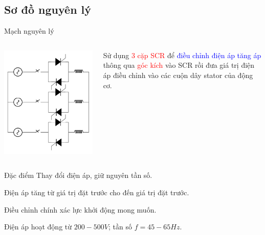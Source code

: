 \documentclass{beamer}
\begin{document}
\subsection*{Sơ đồ nguyên lý}
\begin{frame}{Mạch nguyên lý}
	\vspace{-1.2cm}
	\begin{columns}
		\begin{center}
			\includegraphics[scale=.45,angle=-90]{../sodomach/khoidongmem.pdf} 
		\end{center}
		
		\justifying
		Sử dụng \textcolor{red}{3 cặp SCR} để \textcolor{blue}{điều chỉnh điện áp} \textcolor{blue}{tăng áp} thông qua \textcolor{red}{góc kích} vào SCR rồi đưa giá trị điện áp điều chỉnh vào các cuộn dây stator của động cơ.
	\end{columns}
	\begin{block}{Đặc điểm}
		\justifying
		Thay đổi điện áp, giữ nguyên tần số.
		
		\begin{list}{--}{}
			\item Điện áp tăng từ giá trị đặt trước cho đến giá trị đặt trước.
			\item Điều chỉnh chính xác lực khởi động mong muốn.
			\item Điện áp hoạt động từ $200-500V$; tần số $f = 45-65Hz$.
		\end{list}
	\end{block}
\end{frame}
\end{document}
